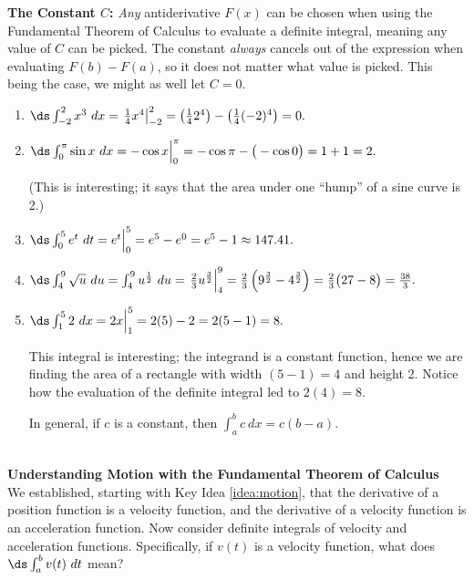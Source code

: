 \noindent\textbf{The Constant $C$:} \textit{Any} antiderivative $F(x)$ can be chosen when using the Fundamental Theorem of Calculus to evaluate a definite integral, meaning any value of $C$ can be picked. The constant \textit{always} cancels out of the expression when evaluating $F(b)-F(a)$, so it does not matter what value is picked. This being the case, we might as well let $C=0$.\\

{\begin{enumerate}
\item	$\ds \int_{-2}^2 x^3\ dx = \left.\frac14x^4\right|_{-2}^2 = \left(\frac142^4\right) - \left(\frac14(-2)^4\right) = 0.$
\item		$\ds \int_0^\pi \sin x\ dx = -\cos x\Big|_0^\pi = -\cos \pi- \big(-\cos 0\big) = 1+1=2.$ 

(This is interesting; it says that the area under one ``hump'' of a sine curve is 2.)
\item	 $\ds \int_0^5e^t\ dt = e^t\Big|_0^5 = e^5 - e^0 = e^5-1 \approx 147.41.$
\item		$\ds \int_4^9 \sqrt{u}\ du = \int_4^9 u^\frac12\ du = \left.\frac23u^\frac32\right|_4^9 = \frac23\left(9^\frac32-4^\frac32\right) = \frac23\big(27-8\big) =\frac{38}3.$
\item		$\ds \int_1^5 2\ dx = 2x\Big|_1^5 = 2(5)-2=2(5-1)=8.$ 

This integral is interesting; the integrand is a constant function, hence we are finding the area of a rectangle with width $(5-1)=4$ and height 2. Notice how the evaluation of the definite integral led to $2(4)=8$. 

In general, if $c$ is a constant, then $\int_a^b c\ dx = c(b-a)$.
\end{enumerate}
\vskip -15pt
}\\

\noindent\textbf{\large Understanding Motion with the Fundamental Theorem of Calculus}\\

We established, starting with Key Idea \ref{idea:motion}, that the derivative of a position function is a velocity function, and the derivative of a velocity function is an acceleration function. Now consider definite integrals of velocity and acceleration functions. Specifically, if $v(t)$ is a velocity function, what does $\ds \int_a^b v(t)\ dt$ mean?


